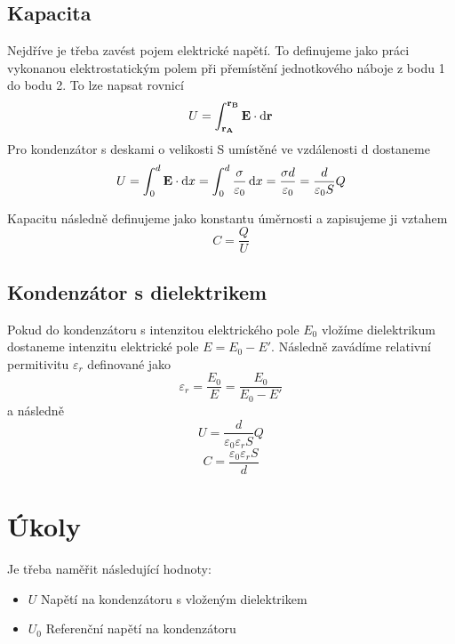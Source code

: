 \documentclass[titlepage]{article}
\begin{document}
    		\subsection{Kapacita}
    			Nejdříve je třeba zavést pojem elektrické napětí. To definujeme jako práci vykonanou elektrostatickým polem při přemístění jednotkového náboje z  bodu 1 do bodu 2. To lze napsat rovnicí
    			\begin{equation}
    				U = \int^{\vb{r_B}}_{\vb{r_A}}\vb{E}\cdot\dd{\vb{r}}
    			\end{equation}
    			Pro kondenzátor s deskami o velikosti S umístěné ve vzdálenosti d dostaneme
    			\begin{equation}
    				U = \int^d_0\vb{E}\cdot\dd{x} = \int_0^d \frac{\sigma}{\varepsilon_0}\dd{x} = \frac{\sigma d}{\varepsilon_0} = \frac{d}{\varepsilon_0 S}Q
    			\end{equation}
    			
    			Kapacitu následně definujeme jako konstantu úměrnosti a zapisujeme ji vztahem
    			\begin{equation}
    				C = \frac{Q}{U}
    			\end{equation}
    		\subsection{Kondenzátor s dielektrikem}
    			Pokud do kondenzátoru s intenzitou elektrického pole $E_0$ vložíme dielektrikum dostaneme intenzitu elektrické pole $E = E_0-E'$. Následně zavádíme relativní permitivitu $\varepsilon_r$ definované jako
    			\begin{equation}
    				\varepsilon_r = \frac{E_0}{E} = \frac{E_0}{E_0 - E'}
    			\end{equation}
    			a následně
    			\begin{equation}
    				U = \frac{d}{\varepsilon_0 \varepsilon_r S}Q
    			\end{equation}
    			\begin{equation}
    				C = \frac{\varepsilon_0 \varepsilon_r S}{d}
    			\end{equation}
    	\section{Úkoly}
    		Je třeba naměřit následující hodnoty:
    		\begin{itemize}
    		\item $U$ Napětí na kondenzátoru s vloženým dielektrikem
    		\item $U_0$ Referenční napětí na kondenzátoru
    		\end{itemize}
\end{document}
